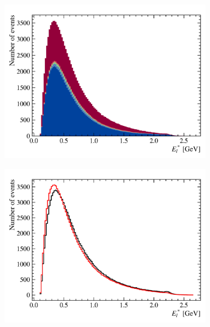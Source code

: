 \begin{figure}[!htb]
\begin{subfigure}[b]{0.32\textwidth}
        \includegraphics[width=\textwidth]{figs-fit-fit-templates/data-driven-plots/misid/D0_el_smr.pdf}
    \end{subfigure}
    \hfill
    \begin{subfigure}[b]{0.32\textwidth}
        \centering
        \includegraphics[width=\textwidth]{figs-fit-fit-templates/data-driven-plots/misid/D0_el_comp.pdf}
    \end{subfigure}
    \\
    \begin{subfigure}[b]{0.32\textwidth}
        \centering

\end{subfigure}
\end{figure}
